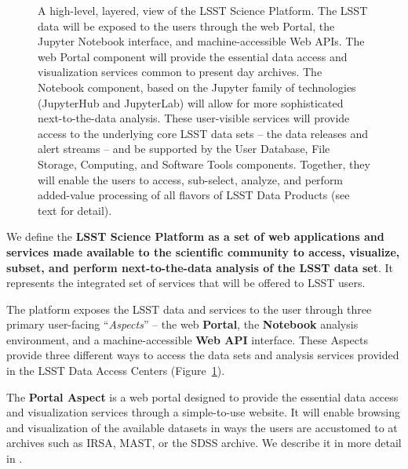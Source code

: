 \begin{figure}
\centering
{}
\caption{
A high-level, layered, view of the LSST Science Platform.  The LSST data
will be exposed to the users through the web Portal, the Jupyter Notebook
interface, and machine-accessible Web APIs.  The web Portal component will
provide the essential data access and visualization services common to
present day archives.  The Notebook component, based on the Jupyter family
of technologies (JupyterHub and JupyterLab) will allow for more
sophisticated next-to-the-data analysis.  These user-visible services will
provide access to the underlying core LSST data sets -- the data releases and
alert streams -- and be supported by the User Database, File Storage,
Computing, and Software Tools components.  Together, they will enable the
users to access, sub-select, analyze, and perform added-value processing of
all flavors of LSST Data Products (see text for detail).
\label{fig:layeredLSP}}
\end{figure}

We define the \textbf{LSST Science Platform as a set of web applications and services
made available to the scientific community to access, visualize, subset, and
perform next-to-the-data analysis of the LSST data set}. It represents the integrated
set of services that will be offered to LSST users.

The platform exposes the LSST data
and services to the user through three primary user-facing ``\textit{Aspects}'' -- the web \textbf{Portal},
the \textbf{Notebook} analysis environment, and a machine-accessible \textbf{Web API} interface.
These Aspects provide three different ways to access the data sets and analysis services provided in the LSST Data Access Centers (Figure~\ref{fig:layeredLSP}).

The \textbf{Portal Aspect} is a web portal designed to provide the essential data
access and visualization services through a simple-to-use website.  It will
enable browsing and visualization of the available datasets in ways the
users are accustomed to at archives such as IRSA, MAST, or the SDSS archive.
We describe it in more detail in .

